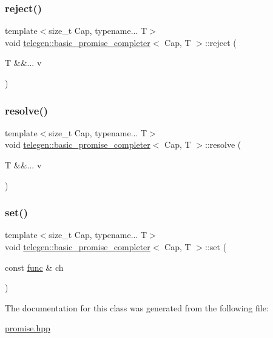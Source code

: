 \subsubsection{\texorpdfstring{reject()}{reject()}}
{\footnotesize\ttfamily template$<$size\+\_\+t Cap, typename... T$>$ \\
void \hyperlink{classtelegen_1_1basic__promise__completer}{telegen\+::basic\+\_\+promise\+\_\+completer}$<$ Cap, T $>$\+::reject (\begin{DoxyParamCaption}\item[{T \&\&...}]{v }\end{DoxyParamCaption})\hspace{0.3cm}{\ttfamily [inline]}}

\mbox{\label{classtelegen_1_1basic__promise__completer_a44debb763916840e1070a4141d48fb22}} 
\subsubsection{\texorpdfstring{resolve()}{resolve()}}
{\footnotesize\ttfamily template$<$size\+\_\+t Cap, typename... T$>$ \\
void \hyperlink{classtelegen_1_1basic__promise__completer}{telegen\+::basic\+\_\+promise\+\_\+completer}$<$ Cap, T $>$\+::resolve (\begin{DoxyParamCaption}\item[{T \&\&...}]{v }\end{DoxyParamCaption})\hspace{0.3cm}{\ttfamily [inline]}}

\mbox{\label{classtelegen_1_1basic__promise__completer_a414f56ce6d13002656a789a5ebe86c2b}} 
\subsubsection{\texorpdfstring{set()}{set()}}
{\footnotesize\ttfamily template$<$size\+\_\+t Cap, typename... T$>$ \\
void \hyperlink{classtelegen_1_1basic__promise__completer}{telegen\+::basic\+\_\+promise\+\_\+completer}$<$ Cap, T $>$\+::set (\begin{DoxyParamCaption}\item[{const \hyperlink{classtelegen_1_1basic__promise__completer_a0f689589e2a64063b01ea7a4268e8cfe}{func} \&}]{ch }\end{DoxyParamCaption})\hspace{0.3cm}{\ttfamily [inline]}}



The documentation for this class was generated from the following file\+:\begin{DoxyCompactItemize}
\item 
\hyperlink{promise_8hpp}{promise.\+hpp}\end{DoxyCompactItemize}
